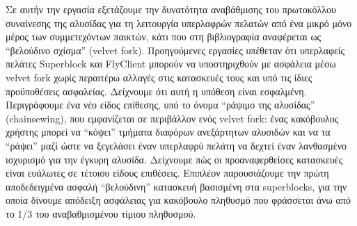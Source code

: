 Σε αυτήν την εργασία εξετάζουμε την δυνατότητα αναβάθμισης του πρωτοκόλλου συναίνεσης της αλυσίδας για τη λειτουργία υπερλαφρών πελατών από ένα μικρό μόνο μέρος των συμμετεχόντων παικτών, κάτι που στη βιβλιογραφία αναφέρεται ως ``βελούδινο σχίσμα'' (velvet fork). Προηγούμενες εργασίες υπέθεταν ότι υπερλαφείς πελάτες Superblock και FlyClient μπορούν να υποστηριχθούν με ασφάλεια μέσω velvet fork χωρίς περαιτέρω αλλαγές στις κατασκευές τους και υπό τις ίδιες προϋποθέσεις ασφαλείας. Δείχνουμε ότι αυτή η υπόθεση είναι εσφαλμένη. Περιγράφουμε ένα νέο είδος επίθεσης, υπό το όνομα ``ράψιμο της αλυσίδας'' (chainsewing), που εμφανίζεται σε περιβάλλον ενός velvet fork: ένας κακόβουλος χρήστης μπορεί να ``κόψει'' τμήματα διαφόρων ανεξάρτητων αλυσιδών και να τα ``ράψει'' μαζί ώστε να ξεγελάσει έναν υπερλαφρύ πελάτη να δεχτεί έναν λανθασμένο ισχυρισμό για την έγκυρη αλυσίδα. Δείχνουμε πώς οι προαναφερθείσες κατασκευές είναι ευάλωτες σε τέτοιου είδους επιθέσεις. Επιπλέον παρουσιάζουμε την πρώτη αποδεδειγμένα ασφαλή ``βελούδινη'' κατασκευή βασισμένη στα superblocks, για την οποία δίνουμε απόδειξη ασφάλειας για κακόβουλο πληθυσμό που φράσσεται άνω από το 1/3 του αναβαθμισμένου τίμιου πληθυσμού.

\newpage